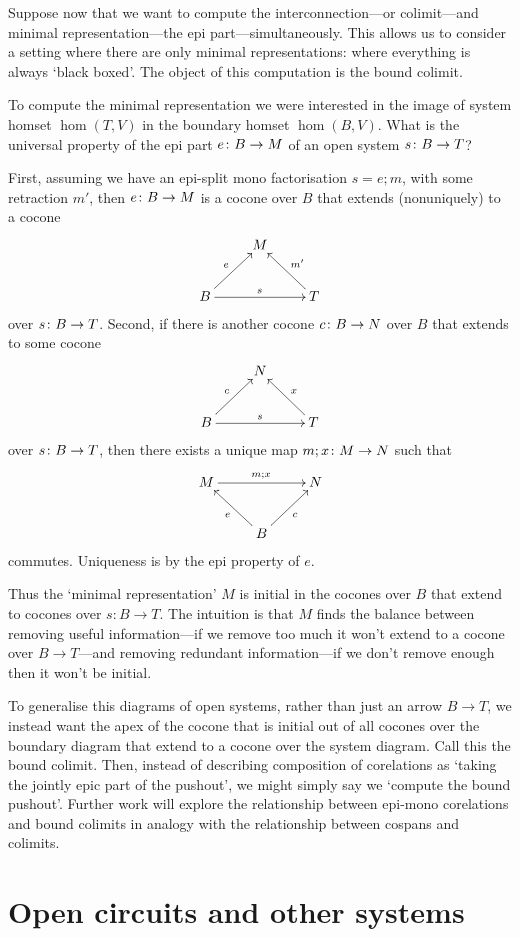 Suppose now that we want to compute the interconnection---or colimit---and minimal
representation---the epi part---simultaneously. This allows us to consider a
setting where there are only minimal representations: where everything is always
`black boxed'. The object of this computation is the bound colimit. 

To compute the minimal representation we were interested in the image of system
homset $\hom(T,V)$ in the boundary homset $\hom(B,V)$. What is the universal
property of the epi part $e{\colon} B \to M$ of an open system $s{\colon} B \to T$?

First, assuming we have an epi-split mono factorisation $s = e;m$, with some
retraction $m'$, then $e{\colon} B \to M$ is a cocone over $B$ that extends
(nonuniquely) to a cocone
\[
  \xymatrix{
    & M \\
    B \ar[ur]^e \ar[rr]^s &&  T \ar[ul]_{m'}
  }
\]
over $s{\colon} B \to T$. Second, if there is another cocone $c{\colon} B \to N$ over $B$ that extends to
some cocone
\[
  \xymatrix{
    & N \\
    B \ar[ur]^c \ar[rr]^s &&  T \ar[ul]_{x}
  }
\]
over $s{\colon} B \to T$, then there exists a unique map $m;x{\colon} M \to N$ such that
\[
  \xymatrix{
    M \ar[rr]^{m;x} && N\\
    & B \ar[ul]^e \ar[ur]_c
  }
\]
commutes. Uniqueness is by the epi property of $e$.

Thus the `minimal representation' $M$ is initial in the cocones over $B$ that
extend to cocones over $s: B \to T$.  The intuition is that $M$ finds the
balance between removing useful information---if we remove too much it won't
extend to a cocone over $B \to T$---and removing redundant information---if we
don't remove enough then it won't be initial.

To generalise this diagrams of open systems, rather than just an arrow $B \to
T$, we instead want the apex of the cocone that is initial out of all cocones
over the boundary diagram that extend to a cocone over the system diagram. Call
this the bound colimit. Then, instead of describing composition of corelations
as `taking the jointly epic part of the pushout', we might simply say we
`compute the bound pushout'. Further work will explore the relationship between
epi-mono corelations and bound colimits in analogy with the relationship between
cospans and colimits.


\section{Open circuits and other systems}

